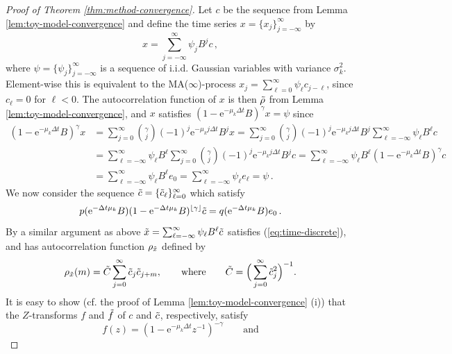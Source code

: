 \documentclass[12pt]{article} %
\begin{document}
\begin{proof}[Proof of Theorem \ref{thm:method-convergence}]

Let $c$ be the sequence from Lemma \ref{lem:toy-model-convergence} and define the time series $x = \{x_j\}_{j = -\infty}^{\infty}$ by
%
$$x = \sum_{j = -\infty}^\infty \psi_j B^j c \, ,$$
%
where $\psi = \{\psi_j\}_{j = -\infty}^\infty$
is a sequence of i.i.d. Gaussian variables with variance $\sigma^2_{ k}$. Element-wise this is equivalent to the MA($\infty$)-process $x_j = \sum_{\ell = 0}^\infty \psi_\ell c_{j - \ell}$, since $c_{\ell} = 0$ for $\ell < 0$. The autocorrelation function of $x$ is then $\Tilde{\rho}$ from Lemma \ref{lem:toy-model-convergence}, and $x$ satisfies $(1 - \mathrm{e}^{-\mu_k \Delta t} B)^\gamma x = \psi$ since
%
\begin{align*}
    (1 - \mathrm{e}^{-\mu_k \Delta t} B)^\gamma x &= \sum_{j = 0}^\infty \binom{\gamma}{j} (-1)^j \mathrm{e}^{- \mu_k j\Delta t } B^j x = \sum_{j = 0}^\infty \binom{\gamma}{j} (-1)^j \mathrm{e}^{- \mu_k j\Delta t } B^j \sum_{\ell = -\infty}^{\infty} \psi_\ell %
    B^\ell c\\
    &= \sum_{\ell = -\infty}^\infty %
    \psi_\ell B^\ell \sum_{j = 0}^{\infty} \binom{\gamma}{j} (-1)^j \mathrm{e}^{- \mu_k j\Delta t } B^j c = \sum_{\ell = -\infty}^\infty \psi_\ell B^\ell (1 - \mathrm{e}^{- \mu_k \Delta t} B)^\gamma c\\
    &= \sum_{\ell = -\infty}^\infty \psi_\ell B^\ell e_0 = \sum_{\ell = -\infty}^{\infty} \psi_\ell e_\ell = \psi\, .
\end{align*}
%
We now consider the sequence $\Tilde{c} = \{\Tilde{c}_\ell\}_{\ell = 0}^\infty$ which satisfy
%
\begin{equation*}
p(\mathrm{e}^{-\Delta t \mu_k} B) (1 - \mathrm{e}^{-\Delta t \mu_k} B)^{\lfloor \gamma \rfloor} \Tilde{c} = q(\mathrm{e}^{-\Delta t \mu_k} B) e_0 \, .
\end{equation*}
%
By a similar argument as above $\Tilde{x} = \sum_{\ell = -\infty}^\infty \psi_\ell B^\ell \Tilde{c}$ satisfies (\ref{eq:time-discrete}), and has autocorrelation function $\rho_{\Tilde{x}}$ defined by $$\rho_{\Tilde{x}}(m) = \Tilde{C} \sum_{j = 0}^\infty \Tilde{c}_j \Tilde{c}_{j + m}, \qquad \text{where}\qquad \Tilde{C} = \Big(\sum_{j = 0}^\infty \Tilde{c}_j^2\Big)^{-1}.$$
It is easy to show (cf. the proof of Lemma \ref{lem:toy-model-convergence} (i)) that the $Z$-transforms $f$ and $\Tilde{f}$ of $c$ and $\Tilde{c}$, respectively, satisfy
%
$$f(z) = (1 - \mathrm{e}^{-\mu_k \Delta t} z^{ -1 })^{-\gamma} \qquad \text{and}
$$
\end{proof}
\end{document}
